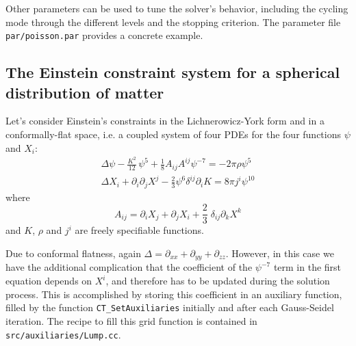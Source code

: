 Other parameters can be used to tune the solver's behavior, 
including the cycling mode through the different levels and the
stopping criterion. The parameter file \texttt{par/poisson.par}
provides a concrete example.

\subsection{The Einstein constraint system for a spherical distribution of matter}
Let's consider Einstein's constraints in the Lichnerowicz-York form
and in a conformally-flat space, 
i.e. a coupled system of four PDEs for the four functions $\psi$ and 
$X_i$:
\begin{eqnarray}
\label{eq:CTT}
 \Delta \psi - \frac{K^2}{12}\,\psi^5 + \frac{1}{8} {A}_{ij} {A}^{ij} \psi^{-7} = - 2 \pi \rho \psi^5 \\
 \Delta X_i + \partial_i \partial_j X^j - \frac{2}{3} \psi^6 \delta^{ij} \partial_i K = 8 \pi j^i \psi^{10}
\end{eqnarray} 
where
\begin{equation}
A_{ij}=\partial_i X_j + \partial_j X_i + \frac{2}{3} \; \delta_{ij} \partial_k X^k
\end{equation}
and $K$, $\rho$ and $j^i$ are freely specifiable functions.

Due to conformal flatness, again $\Delta = \partial_{xx} + \partial_{yy} 
+ \partial_{zz}$. However, in this case we have the additional
complication that the coefficient of the $\psi^{-7}$ term in the
first equation depends on $X^i$, and therefore has to be updated
during the solution process. This is accomplished by storing this 
coefficient in an auxiliary function, filled by the function
\texttt{CT\_SetAuxiliaries} initially and after each Gauss-Seidel 
iteration. The recipe to fill this grid function is contained in
\texttt{src/auxiliaries/Lump.cc}.

